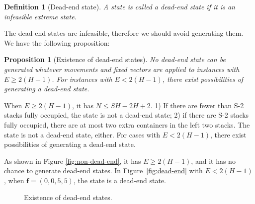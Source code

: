 \documentclass[review,3p,times,12pt,number]{elsarticle}\usepackage{amsmath}\usepackage{amssymb}
\newtheorem{proposition}{Proposition}
\newtheorem{definition}{Definition}
\begin{document}
\begin{definition}[Dead-end state]
A state is called a dead-end state if it is an infeasible extreme state.
\end{definition}

The dead-end states are infeasible, therefore we should avoid generating them.
We have the following proposition:

\begin{proposition}[Existence of dead-end states]
No dead-end state can be generated whatever movements and fixed vectors are applied to instances with $E\ge2(H-1)$. For instances with $E<2(H-1)$, there exist possibilities of generating a dead-end state.
\end{proposition}
When $E\ge2(H-1)$, it has $N\le SH-2H+2$.
1) If there are fewer than S-2 stacks fully occupied, the state is not a dead-end state; 2) if there are S-2 stacks fully occupied, there are at most two extra containers in the left two stacks. The state is not a dead-end state, either. For cases with $E<2(H-1)$, there exist possibilities of generating a dead-end state.

As shown in Figure \ref{fig:non-dead-end}, it has $E\ge2(H-1)$, and it has no chance to generate dead-end states. In Figure~\ref{fig:dead-end} with $E<2(H-1)$, when $\boldsymbol f=(0,0,5,5)$, the state is a dead-end state.
\begin{figure}[htbp]
\centering
{}
\caption{Existence of dead-end states.}
\end{figure}
\end{document}
